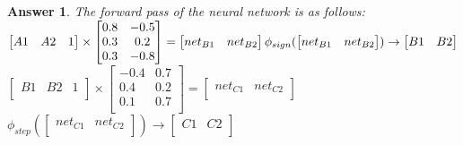 \documentclass[11pt]{article}
\theoremstyle{description}
\theoremstyle{break}
\newtheorem*{answer}{Answer}
\begin{document}
    \begin{answer}
        The forward pass of the neural network is as follows:\\
        $\begin{bmatrix}
             A1 & A2 & 1 \\
        \end{bmatrix}
        \times
        \begin{bmatrix}
            0.8 & -0.5 \\
            0.3 & 0.2  \\
            0.3 & -0.8 \\
        \end{bmatrix}
        =
        \begin{bmatrix}
            net_{B1} & net_{B2} \\
        \end{bmatrix}\\
        \phi_{sign}(
        \begin{bmatrix}
            net_{B1} & net_{B2} \\
        \end{bmatrix}
        )
        \to
        \begin{bmatrix}
            B1 & B2 \\
        \end{bmatrix}$\\
        $\begin{bmatrix}
             B1 & B2 & 1 \\
        \end{bmatrix}
        \times
        \begin{bmatrix}
            -0.4 & 0.7 \\
            0.4  & 0.2 \\
            0.1  & 0.7 \\
        \end{bmatrix}
        =
        \begin{bmatrix}
            net_{C1} & net_{C2} \\
        \end{bmatrix}$\\
        $\phi_{step}(
        \begin{bmatrix}
            net_{C1} & net_{C2} \\
        \end{bmatrix}
        )
        \to
        \begin{bmatrix}
            C1 & C2 \\
        \end{bmatrix}$\\

\end{answer}
\end{document}

